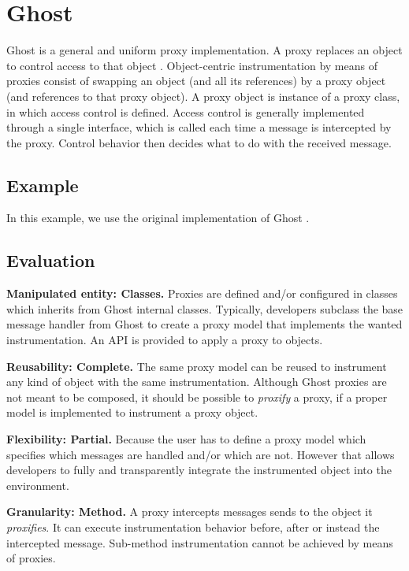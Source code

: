 \documentclass[10pt,twoside,english]{_support/latex/sbabook/sbabook}
\begin{document}
\frontmatter
\pagestyle{plain}

\tableofcontents*
\clearpage\listoffigures

\mainmatter

\chapter{Ghost}
Ghost is a general and uniform proxy implementation\cite{Mart14z}. A proxy replaces an object to control access to that object \cite{alpert1998design}. Object-centric instrumentation by means of proxies consist of swapping an object (and all its references) by a proxy object (and references to that proxy object). A proxy object is instance of a proxy class, in which access control is defined. Access control is generally implemented through a single interface, which is called each time a message is intercepted by the proxy. Control behavior then decides what to do with the received message.
\section{Example}
In this example, we use the original implementation of Ghost \cite{Mart14z}.
\section{Evaluation}
\textbf{Manipulated entity: Classes.} Proxies are defined and/or configured in classes which inherits from Ghost internal classes. Typically, developers subclass the base message handler from Ghost to create a proxy model that implements the wanted instrumentation. An API is provided to apply a proxy to objects.

\textbf{Reusability: Complete.} The same proxy model can be reused to instrument any kind of object with the same instrumentation. Although Ghost proxies are not meant to be composed, it should be possible to \textit{proxify} a proxy, if a proper model is implemented to instrument a proxy object.

\textbf{Flexibility: Partial.} Because the user has to define a proxy model which specifies which messages are handled and/or which are not. However that allows developers to fully and transparently integrate the instrumented object into the environment.

\textbf{Granularity: Method.} A proxy intercepts messages sends to the object it \textit{proxifies}. It can execute instrumentation behavior before, after or instead the intercepted message. Sub-method instrumentation cannot be achieved by means of proxies.
\end{document}
